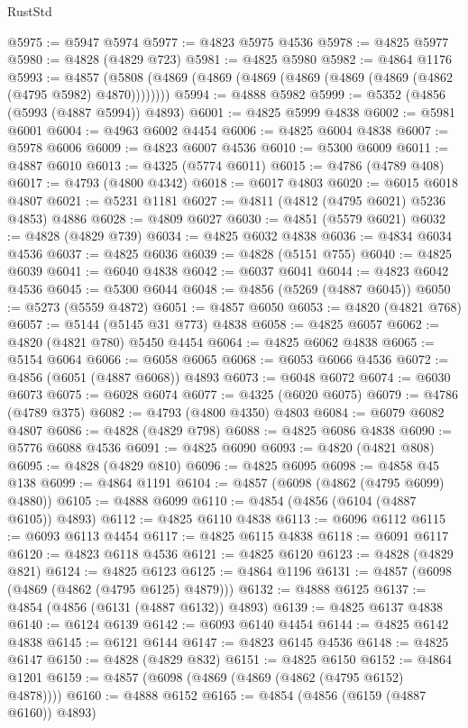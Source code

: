 \begin{lexlean}{RustStd}
\begin{coremodule}
{\begin{coremodule}
{{{{{{{{{{{{{{{{{{{{{{{{{{{{{{{{{{{{{{{{{{{{{{{{{{{{{{{{{{{{{{{{{{{{{{{{{{{{{{{{@5975 := @5947 @5974
@5977 := @4823 @5975 @4536
@5978 := @4825 @5977
@5980 := @4828 (@4829 @723)
@5981 := @4825 @5980
@5982 := @4864 @1176
@5993 := @4857 (@5808 (@4869 (@4869 (@4869 (@4869 (@4869 (@4869 (@4862 (@4795 @5982) @4870))))))))
@5994 := @4888 @5982
@5999 := @5352 (@4856 (@5993 (@4887 @5994)) @4893)
@6001 := @4825 @5999 @4838
@6002 := @5981 @6001
@6004 := @4963 @6002 @4454
@6006 := @4825 @6004 @4838
@6007 := @5978 @6006
@6009 := @4823 @6007 @4536
@6010 := @5300 @6009
@6011 := @4887 @6010
@6013 := @4325 (@5774 @6011)
@6015 := @4786 (@4789 @408)
@6017 := @4793 (@4800 @4342)
@6018 := @6017 @4803
@6020 := @6015 @6018 @4807
@6021 := @5231 @1181
@6027 := @4811 (@4812 (@4795 @6021) @5236 @4853) @4886
@6028 := @4809 @6027
@6030 := @4851 (@5579 @6021)
@6032 := @4828 (@4829 @739)
@6034 := @4825 @6032 @4838
@6036 := @4834 @6034 @4536
@6037 := @4825 @6036
@6039 := @4828 (@5151 @755)
@6040 := @4825 @6039
@6041 := @6040 @4838
@6042 := @6037 @6041
@6044 := @4823 @6042 @4536
@6045 := @5300 @6044
@6048 := @4856 (@5269 (@4887 @6045))
@6050 := @5273 (@5559 @4872)
@6051 := @4857 @6050
@6053 := @4820 (@4821 @768)
@6057 := @5144 (@5145 @31 @773) @4838
@6058 := @4825 @6057
@6062 := @4820 (@4821 @780) @5450 @4454
@6064 := @4825 @6062 @4838
@6065 := @5154 @6064
@6066 := @6058 @6065
@6068 := @6053 @6066 @4536
@6072 := @4856 (@6051 (@4887 @6068)) @4893
@6073 := @6048 @6072
@6074 := @6030 @6073
@6075 := @6028 @6074
@6077 := @4325 (@6020 @6075)
@6079 := @4786 (@4789 @375)
@6082 := @4793 (@4800 @4350) @4803
@6084 := @6079 @6082 @4807
@6086 := @4828 (@4829 @798)
@6088 := @4825 @6086 @4838
@6090 := @5776 @6088 @4536
@6091 := @4825 @6090
@6093 := @4820 (@4821 @808)
@6095 := @4828 (@4829 @810)
@6096 := @4825 @6095
@6098 := @4858 @45 @138
@6099 := @4864 @1191
@6104 := @4857 (@6098 (@4862 (@4795 @6099) @4880))
@6105 := @4888 @6099
@6110 := @4854 (@4856 (@6104 (@4887 @6105)) @4893)
@6112 := @4825 @6110 @4838
@6113 := @6096 @6112
@6115 := @6093 @6113 @4454
@6117 := @4825 @6115 @4838
@6118 := @6091 @6117
@6120 := @4823 @6118 @4536
@6121 := @4825 @6120
@6123 := @4828 (@4829 @821)
@6124 := @4825 @6123
@6125 := @4864 @1196
@6131 := @4857 (@6098 (@4869 (@4862 (@4795 @6125) @4879)))
@6132 := @4888 @6125
@6137 := @4854 (@4856 (@6131 (@4887 @6132)) @4893)
@6139 := @4825 @6137 @4838
@6140 := @6124 @6139
@6142 := @6093 @6140 @4454
@6144 := @4825 @6142 @4838
@6145 := @6121 @6144
@6147 := @4823 @6145 @4536
@6148 := @4825 @6147
@6150 := @4828 (@4829 @832)
@6151 := @4825 @6150
@6152 := @4864 @1201
@6159 := @4857 (@6098 (@4869 (@4869 (@4862 (@4795 @6152) @4878))))
@6160 := @4888 @6152
@6165 := @4854 (@4856 (@6159 (@4887 @6160)) @4893)
}}}}}}}}}}}}}}}}}}}}}}}}}}}}}}}}}}}}}}}}}}}}}}}}}}}}}}}}}}}}}}}}}}}}}}}}}}}}}}}}
\end{coremodule}}
\end{coremodule}
\end{lexlean}
